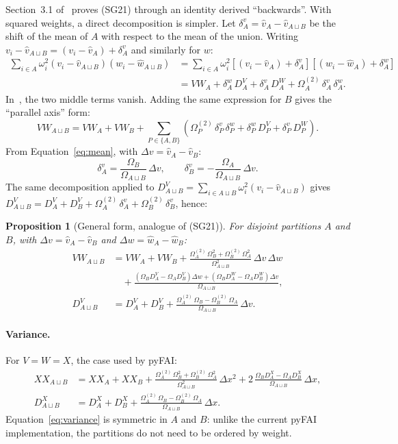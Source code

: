 \documentclass[a4paper,11pt]{article}
\newtheorem{proposition}{Proposition}
\newcommand{\mean}[1]{\widehat{#1}}
\newcommand{\Om}{\Omega}
\newcommand{\OmS}{\Omega^{(2)}}
\newcommand{\D}[2]{D^{#1}_{#2}}
\newcommand{\AB}{{A\sqcup B}}
\begin{document}
Section~3.1 of~\cite{SG18} proves (SG21) through an identity derived ``backwards''. With squared
weights, a direct decomposition is simpler. Let $\delta^v_A = \mean{v}_A - \mean{v}_\AB$ be the shift of
the mean of $A$ with respect to the mean of the union. Writing
$v_i-\mean{v}_\AB = (v_i-\mean{v}_A)+\delta^v_A$ and similarly for $w$:
\begin{align}
  \sum_{i\in A}\omega_i^2(v_i-\mean{v}_\AB)(w_i-\mean{w}_\AB)
  &= \sum_{i\in A}\omega_i^2\left[(v_i-\mean{v}_A)+\delta^v_A\right]\left[(w_i-\mean{w}_A)+\delta^w_A\right]\nonumber\\
  &= VW_A + \delta^w_A\,\D{V}{A} + \delta^v_A\,\D{W}{A} + \OmS_A\,\delta^v_A\,\delta^w_A .
\end{align}
In~\cite{SG18}, the two middle terms vanish. Adding the same expression for $B$ gives the
``parallel axis'' form:
\begin{equation}
  VW_\AB = VW_A + VW_B + \sum_{P\in\{A,B\}}\left(\OmS_P\,\delta^v_P\,\delta^w_P + \delta^w_P\,\D{V}{P} + \delta^v_P\,\D{W}{P}\right).
  \label{eq:parallel}
\end{equation}
From Equation~\eqref{eq:mean}, with $\Delta v = \mean{v}_A - \mean{v}_B$:
\begin{equation}
  \delta^v_A = \frac{\Om_B}{\Om_\AB}\,\Delta v, \qquad
  \delta^v_B = -\frac{\Om_A}{\Om_\AB}\,\Delta v .
\end{equation}
The same decomposition applied to $\D{V}{\AB}=\sum_{i\in\AB}\omega_i^2(v_i-\mean{v}_\AB)$ gives
$\D{V}{\AB} = \D{V}{A}+\D{V}{B}+\OmS_A\,\delta^v_A+\OmS_B\,\delta^v_B$, hence:

\begin{proposition}[General form, analogue of (SG21)]
For disjoint partitions $A$ and $B$, with $\Delta v = \mean{v}_A-\mean{v}_B$ and $\Delta w = \mean{w}_A-\mean{w}_B$:
\begin{align}
  VW_\AB &= VW_A + VW_B
           + \frac{\OmS_A\,\Om_B^2 + \OmS_B\,\Om_A^2}{\Om_\AB^2}\,\Delta v\,\Delta w \nonumber\\
         &\quad + \frac{\left(\Om_B\D{V}{A}-\Om_A\D{V}{B}\right)\Delta w + \left(\Om_B\D{W}{A}-\Om_A\D{W}{B}\right)\Delta v}{\Om_\AB}, \label{eq:general}\\
  \D{V}{\AB} &= \D{V}{A} + \D{V}{B} + \frac{\OmS_A\,\Om_B - \OmS_B\,\Om_A}{\Om_\AB}\,\Delta v. \label{eq:Dmerge}
\end{align}
\end{proposition}

\paragraph{Variance.} For $V=W=X$, the case used by pyFAI:
\begin{align}
  XX_\AB &= XX_A + XX_B + \frac{\OmS_A\,\Om_B^2 + \OmS_B\,\Om_A^2}{\Om_\AB^2}\,\Delta x^2
           + 2\,\frac{\Om_B\D{X}{A}-\Om_A\D{X}{B}}{\Om_\AB}\,\Delta x, \label{eq:variance}\\
  \D{X}{\AB} &= \D{X}{A} + \D{X}{B} + \frac{\OmS_A\,\Om_B - \OmS_B\,\Om_A}{\Om_\AB}\,\Delta x . \label{eq:DXmerge}
\end{align}
Equation~\eqref{eq:variance} is symmetric in $A$ and $B$: unlike the current pyFAI implementation, the
partitions do not need to be ordered by weight.
\end{document}
